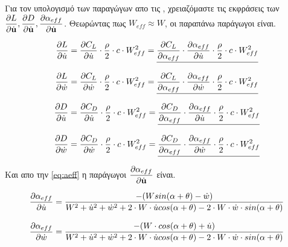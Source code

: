 \vspace{0.5cm}

Για τον υπολογισμό των παραγώγων απο τις , χρειαζόμαστε τις εκφράσεις των $\dfrac{\partial L}{\partial \dot{\mathbf{u}}}, \dfrac{\partial D}{\partial \dot{\mathbf{u}}}, \dfrac{\partial \alpha_{eff}}{\partial \dot{\mathbf{u}}}$. Θεωρώντας πως $W_{eff}\approx W$, οι παραπάνω παράγωγοι είναι.

\begin{equation}
   \begin{aligned} 
   \dfrac{\partial L}{\partial \dot{u}} &= \dfrac{\partial C_L}{\partial \dot{u}}\cdot\dfrac{\rho}{2}\cdot c \cdot W_{eff}^2 =\underline{ \dfrac{\partial C_L}{\partial \alpha_{eff}}\cdot \dfrac{\partial \alpha_{eff}}{\partial \dot{u}}\cdot\dfrac{\rho}{2}\cdot c \cdot W_{eff}^2}\\[8pt]
   \dfrac{\partial L}{\partial \dot{w}} &= \dfrac{\partial C_L}{\partial \dot{w}}\cdot\dfrac{\rho}{2}\cdot c \cdot W_{eff}^2 =\underline{ \dfrac{\partial C_L}{\partial \alpha_{eff}}\cdot \dfrac{\partial \alpha_{eff}}{\partial \dot{w}}\cdot\dfrac{\rho}{2}\cdot c \cdot W_{eff}^2}\\
   \end{aligned} 
    \label{eq:partL}
\end{equation}

\vspace{0.8cm}

\begin{equation}
   \begin{aligned} 
   \dfrac{\partial D}{\partial \dot{u}} &= \dfrac{\partial C_D}{\partial \dot{u}}\cdot\dfrac{\rho}{2}\cdot c \cdot W_{eff}^2 =\underline{ \dfrac{\partial C_D}{\partial \alpha_{eff}}\cdot \dfrac{\partial \alpha_{eff}}{\partial \dot{u}}\cdot\dfrac{\rho}{2}\cdot c \cdot W_{eff}^2}\\[8pt]
   \dfrac{\partial D}{\partial \dot{w}} &= \dfrac{\partial C_D}{\partial \dot{w}}\cdot\dfrac{\rho}{2}\cdot c \cdot W_{eff}^2 =\underline{ \dfrac{\partial C_D}{\partial \alpha_{eff}}\cdot \dfrac{\partial \alpha_{eff}}{\partial \dot{w}}\cdot\dfrac{\rho}{2}\cdot c \cdot W_{eff}^2}\\
   \end{aligned} 
    \label{eq:partD}
\end{equation}

\vspace{0.8cm}

\noindent Και απο την \cref{eq:aeff} η παράγωγοι $\dfrac{\partial \alpha_{eff}}{\partial \dot{\mathbf{u}}}$ είναι.

\begin{align}
\dfrac{\partial \alpha_{eff}}{\partial \dot{u}} &= \dfrac{-(Wsin(\alpha+\theta)-\dot{w})}{W^2 + \dot{u}^2 + \dot{w}^2 + 2\cdot W\cdot \dot{u} cos(\alpha+\theta) - 2\cdot W \cdot \dot{w} \cdot sin(\alpha+\theta)}\\[8pt]
\dfrac{\partial \alpha_{eff}}{\partial \dot{w}} &= \dfrac{-(W\cdot cos(\alpha+\theta)+\dot{u})}{W^2 + \dot{u}^2 + \dot{w}^2 + 2\cdot W\cdot \dot{u} cos(\alpha+\theta) - 2\cdot W \cdot \dot{w} \cdot sin(\alpha+\theta)}
\label{eq:partAeff}
\end{align}

